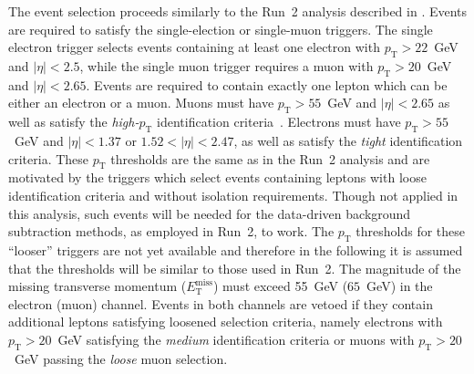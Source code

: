 The event selection proceeds similarly to the Run~2 analysis described in .
Events are required to satisfy the single-election or single-muon triggers.
The single electron trigger selects events containing at least one electron with $p_\mathrm{T} > 22$~GeV
and $|\eta| < 2.5$, while the single muon trigger requires a muon with $p_\mathrm{T} > 20$~GeV and
$|\eta| < 2.65$.
Events are required to contain exactly one lepton which can be either an electron or a muon.
Muons must have $p_\mathrm{T} > 55$~GeV and $|\eta| < 2.65$ as well as satisfy
the \textit{high-$p_\mathrm{T}$} identification criteria~\cite{atlasperf}. 
Electrons must have $p_\mathrm{T} > 55$~GeV and $|\eta| < 1.37$ or $1.52 <|\eta| < 2.47$, as well as satisfy
the {\textit{tight}} identification criteria.
These $p_\mathrm{T}$ thresholds are the same as in the Run~2 analysis and are motivated by the triggers
which select events containing leptons with loose identification criteria and without isolation requirements.
Though not applied in this analysis, such events will be needed for the data-driven background subtraction
methods, as employed in Run~2, to work. The $p_\mathrm{T}$ thresholds for these ``looser'' triggers are not
yet available and therefore in the following it is assumed that the thresholds will be similar to those
used in Run~2. The magnitude of the missing transverse momentum ($E_\mathrm{T}^\mathrm{miss}$) must exceed 55~GeV ($65$~GeV) in
the electron (muon) channel. Events in both channels are vetoed if they contain additional leptons satisfying
loosened selection criteria, namely electrons with $p_\mathrm{T} > 20$~GeV satisfying the \textit{medium}
identification criteria or muons with $p_\mathrm{T} > 20$~GeV passing the \textit{loose} muon selection. 

